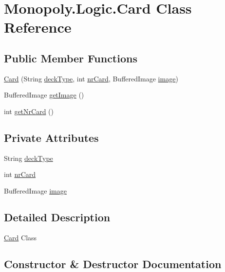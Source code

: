 \hypertarget{class_monopoly_1_1_logic_1_1_card}{}\section{Monopoly.\+Logic.\+Card Class Reference}
\label{class_monopoly_1_1_logic_1_1_card}
\subsection*{Public Member Functions}
\begin{DoxyCompactItemize}
\item 
\hyperlink{class_monopoly_1_1_logic_1_1_card_ae222c97575dd9bb9fa99b0b99ca5cf76}{Card} (String \hyperlink{class_monopoly_1_1_logic_1_1_card_abf85f52742c8e3825de0d8f11af76169}{deck\+Type}, int \hyperlink{class_monopoly_1_1_logic_1_1_card_af79057d535b01c8a230e866dc0012c9b}{nr\+Card}, Buffered\+Image \hyperlink{class_monopoly_1_1_logic_1_1_card_a1825135f29042cb37fbe0cdfa29a4806}{image})
\item 
Buffered\+Image \hyperlink{class_monopoly_1_1_logic_1_1_card_ae24ee12ca60b8113f6d48323e1a9d93d}{get\+Image} ()
\item 
int \hyperlink{class_monopoly_1_1_logic_1_1_card_a851e04008dbf1c3e667d8e5e567ef5d7}{get\+Nr\+Card} ()
\end{DoxyCompactItemize}
\subsection*{Private Attributes}
\begin{DoxyCompactItemize}
\item 
String \hyperlink{class_monopoly_1_1_logic_1_1_card_abf85f52742c8e3825de0d8f11af76169}{deck\+Type}
\item 
int \hyperlink{class_monopoly_1_1_logic_1_1_card_af79057d535b01c8a230e866dc0012c9b}{nr\+Card}
\item 
Buffered\+Image \hyperlink{class_monopoly_1_1_logic_1_1_card_a1825135f29042cb37fbe0cdfa29a4806}{image}
\end{DoxyCompactItemize}


\subsection{Detailed Description}
\hyperlink{class_monopoly_1_1_logic_1_1_card}{Card} Class 

\subsection{Constructor \& Destructor Documentation}
